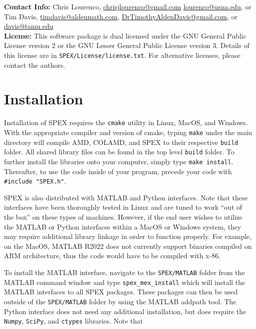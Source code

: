 \documentclass[12pt,oneside]{book}
\theoremstyle{definition}
\begin{document}
\noindent \textbf{Contact Info:} Chris Lourenco,
\href{mailto:chrisjlourenco@gmail.com}{chrisjlourenco@gmail.com} \href{mailto:lourenco@usna.edu}{lourenco@usna.edu}, or Tim Davis,
\href{mailto:timdavis@aldenmath.com}{timdavis@aldenmath.com},
\href{DrTimothyAldenDavis@gmail.com}{DrTimothyAldenDavis@gmail.com}, or \href{mailto:davis@tamu.edu}{davis@tamu.edu}\\

\noindent \textbf{License:} This software package is dual licensed under the GNU General Public License version 2 or the GNU Lesser General Public License version 3. Details of this license are in \verb|SPEX/License/license.txt|. For alternative licenses, please contact the authors.


\section{Installation} \label{s:util:install}
Installation of SPEX requires the \verb|cmake| utility in Linux, MacOS, and Windows. 
With the appropriate compiler and version of cmake, typing \verb|make| under the main 
directory will compile AMD, COLAMD, and SPEX to their respective \verb|build| folder.
All shared library files can be found in the top level \verb|build| folder. To further
install the libraries onto your computer, simply type \verb|make install|.  Thereafter, 
to use the code inside of your program, precede your code with \newline \verb|#include "SPEX.h"|.

SPEX is also distributed with MATLAB and Python interfaces. Note that these interfaces have been thoroughly tested in Linux and are tuned to work ``out of the box'' on these types of machines. However, if the end user wishes to utilize the MATLAB or Python interfaces within a MacOS or Windows system, they may require additional library linkage in order to function properly. For example, on the MacOS, MATLAB R2022 does not currently support binaries compiled on ARM architecture, thus the code would have to be compiled with x-86.

To install the MATLAB interface,
navigate to the \verb|SPEX/MATLAB| folder from the MATLAB command window and type
\verb|spex_mex_install| which will install the MATLAB interfaces to all SPEX packages.
These packages can then be used outside of the \verb|SPEX/MATLAB| folder by using the 
MATLAB addpath tool. The Python interface does not need any additional installation, but does require the \texttt{Numpy}, \texttt{SciPy}, and \texttt{ctypes} libraries. Note that 
\end{document}
